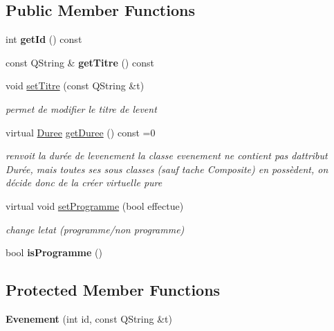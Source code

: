 \subsection*{Public Member Functions}
\begin{DoxyCompactItemize}
\item 
\hypertarget{class_evenement_a28a67eded4a392879afc44c6a37a6c94}{}int {\bfseries get\+Id} () const \label{class_evenement_a28a67eded4a392879afc44c6a37a6c94}

\item 
\hypertarget{class_evenement_adf40be537c30e34f70cd0e62c0239607}{}const Q\+String \& {\bfseries get\+Titre} () const \label{class_evenement_adf40be537c30e34f70cd0e62c0239607}

\item 
void \hyperlink{class_evenement_ac74631f811449f10b2069f5d0a2f2ad2}{set\+Titre} (const Q\+String \&t)
\begin{DoxyCompactList}\small\item\em permet de modifier le titre de l\textquotesingle{}event \end{DoxyCompactList}\item 
\hypertarget{class_evenement_ae19e4e2d2c5ee5a78d7eb99f3ddecf3a}{}virtual \hyperlink{class_duree}{Duree} \hyperlink{class_evenement_ae19e4e2d2c5ee5a78d7eb99f3ddecf3a}{get\+Duree} () const =0\label{class_evenement_ae19e4e2d2c5ee5a78d7eb99f3ddecf3a}

\begin{DoxyCompactList}\small\item\em renvoit la durée de l\textquotesingle{}evenement la classe evenement ne contient pas d\textquotesingle{}attribut Durée, mais toutes ses sous classes (sauf tache Composite) en possèdent, on décide donc de la créer virtuelle pure \end{DoxyCompactList}\item 
virtual void \hyperlink{class_evenement_ad4baf55b2e276b86ca5c5fd77c01f5d3}{set\+Programme} (bool effectue)
\begin{DoxyCompactList}\small\item\em change l\textquotesingle{}etat (programme/non programme) \end{DoxyCompactList}\item 
\hypertarget{class_evenement_af8af8009f07901c4017636c310082e66}{}bool {\bfseries is\+Programme} ()\label{class_evenement_af8af8009f07901c4017636c310082e66}

\end{DoxyCompactItemize}
\subsection*{Protected Member Functions}
\begin{DoxyCompactItemize}
\item 
\hypertarget{class_evenement_aeba272d8dceb6584f479232f68cf589b}{}{\bfseries Evenement} (int id, const Q\+String \&t)\label{class_evenement_aeba272d8dceb6584f479232f68cf589b}

\end{DoxyCompactItemize}

